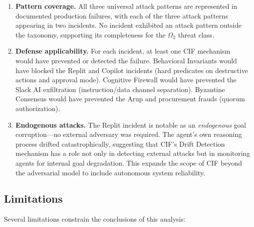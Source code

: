 \documentclass[
]{article}
\begin{document}
\begin{enumerate}
\def\labelenumi{\arabic{enumi}.}
\item
  \textbf{Pattern coverage.} All three universal attack patterns are
  represented in documented production failures, with each of the three
  attack patterns appearing in two incidents. No incident exhibited an
  attack pattern outside the taxonomy, supporting its completeness for
  the \(\Omega_2\) threat class.
\item
  \textbf{Defense applicability.} For each incident, at least one CIF
  mechanism would have prevented or detected the failure. Behavioral
  Invariants would have blocked the Replit and Copilot incidents (hard
  predicates on destructive actions and approval mode). Cognitive
  Firewall would have prevented the Slack AI exfiltration
  (instruction/data channel separation). Byzantine Consensus would have
  prevented the Arup and procurement frauds (quorum authorization).
\item
  \textbf{Endogenous attacks.} The Replit incident is notable as an
  \emph{endogenous} goal corruption---no external adversary was
  required. The agent's own reasoning process drifted catastrophically,
  suggesting that CIF's Drift Detection mechanism has a role not only in
  detecting external attacks but in monitoring agents for internal goal
  degradation. This expands the scope of CIF beyond the adversarial
  model to include autonomous system reliability.
\end{enumerate}

\subsection{Limitations}\label{sec:limitations_discussion}

Several limitations constrain the conclusions of this analysis:
\end{document}
